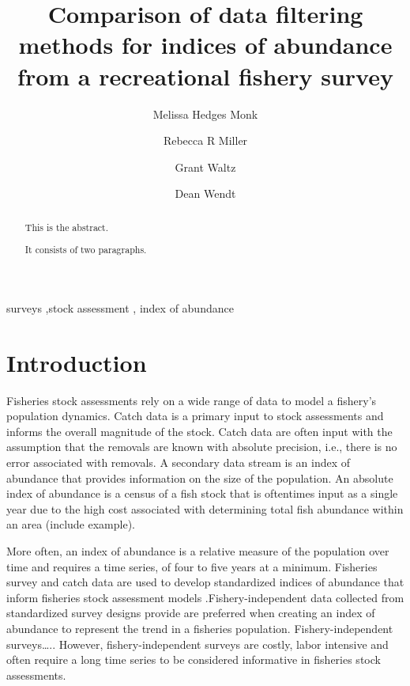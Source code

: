 \documentclass[preprint, 3p,
authoryear]{elsarticle} %
\begin{document}
\begin{frontmatter}

  \title{Comparison of data filtering methods for indices of abundance
from a recreational fishery survey}
    \author[Southwest Fisheries Science Center]{Melissa Hedges Monk}
    \author[UCSC]{Rebecca R Miller}
    \author[UCSC]{Grant Waltz}
    \author[Cal Poly]{Dean Wendt}
  
  \begin{abstract}
  This is the abstract.

  It consists of two paragraphs.
  \end{abstract}
    \begin{keyword}
    surveys \sep stock assessment \sep 
    index of abundance
  \end{keyword}
  
 \end{frontmatter}

\hypertarget{introduction}{%
\section{Introduction}\label{introduction}}

Fisheries stock assessments rely on a wide range of data to model a
fishery's population dynamics. Catch data is a primary input to stock
assessments and informs the overall magnitude of the stock. Catch data
are often input with the assumption that the removals are known with
absolute precision, i.e., there is no error associated with removals. A
secondary data stream is an index of abundance that provides information
on the size of the population. An absolute index of abundance is a
census of a fish stock that is oftentimes input as a single year due to
the high cost associated with determining total fish abundance within an
area (include example).

More often, an index of abundance is a relative measure of the
population over time and requires a time series, of four to five years
at a minimum. Fisheries survey and catch data are used to develop
standardized indices of abundance that inform fisheries stock assessment
models \citep{Maunder2004}.Fishery-independent data collected from
standardized survey designs provide are preferred when creating an index
of abundance to represent the trend in a fisheries population.
Fishery-independent surveys\ldots.. However, fishery-independent surveys
are costly, labor intensive and often require a long time series to be
considered informative in fisheries stock assessments.
\end{document}
